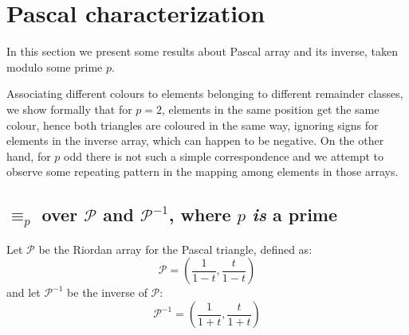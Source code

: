 
\section{Pascal characterization}

In this section we present some results about Pascal array and
its inverse, taken modulo some prime $p$. 

Associating different colours to elements belonging to different remainder
classes, we show formally that for $p=2$, elements in the same
position get the same colour, hence both triangles are coloured in the same
way, ignoring signs for elements in the inverse array, which can happen to be
negative. On the other hand, for $p$ odd there is not such a simple
correspondence and we attempt to observe some repeating pattern in the mapping
among elements in those arrays.

\subsection{$\equiv_{p}$ over $\mathcal{P}$ and $\mathcal{P}^{-1}$,
    where $p$ \emph{is} a prime}

Let $\mathcal{P}$ be the Riordan array for the Pascal triangle,
defined as:
\begin{displaymath} 
    \mathcal{P} = \left(\frac{1}{1-t}, \frac{t}{1-t}  \right)
\end{displaymath} 
and let $\mathcal{P}^{-1}$ be the inverse of $\mathcal{P}$:
\begin{displaymath} 
    \mathcal{P}^{-1} = \left(\frac{1}{1+t}, \frac{t}{1+t}  \right)
\end{displaymath} 

